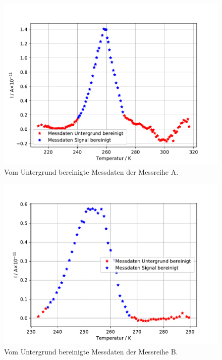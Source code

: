 \begin{figure}
    \centering
    \includegraphics[width=\textwidth,keepaspectratio]{figure/Messdate_rein_A.pdf}
    \caption{Vom Untergrund bereinigte Messdaten der Messreihe A.}
    \label{fig:Messdaten_bereinigt_A}
\end{figure}
\begin{figure}
    \centering
    \includegraphics[width=\textwidth,keepaspectratio]{figure/Messdate_rein_B.pdf}
    \caption{Vom Untergrund bereinigte Messdaten der Messreihe B.}
    \label{fig:Messdaten_bereinigt_B}
\end{figure}
\FloatBarrier

